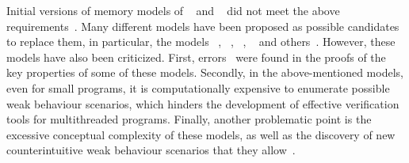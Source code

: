 Initial versions of memory models of \CPP~\autocite{Batty-al:POPL11} and \Java~\autocite{Manson-al:POPL05} did not meet the above requirements~\autocite{Sevcik-Aspinall:ECOOP08,Vafeiadis-al:POPL15,Batty-al:ESOP15}.
Many different models have been proposed as possible candidates to replace them, in particular, the models \Wkm~\autocite{Chakraborty-Vafeiadis:POPL19}, \Prm~\autocite{Kang-al:POPL17},
\MRD~\autocite{Paviotti-al:ESOP20}, \PwT~\autocite{Jagadeesan-al:OOPSLA2020,Jeffrey-al:POPL2022}
and others~\autocite{Jeffrey-Riely:LICS16, PichonPharabod-Sewell:POPL16, Paviotti-al:ESOP20}.
However, these models have also been criticized.
First, errors~\autocite{Jeffrey-Riely:LICS16,PichonPharabod-PhD18,Lahav-al:PLDI17} were found in the proofs of the key properties of some of these models. Secondly, in the above-mentioned models, even for small programs, it is computationally expensive to enumerate possible weak behaviour scenarios, which hinders the development of effective verification tools for multithreaded programs. Finally, another problematic point is the excessive conceptual complexity of these models, as well as the discovery of new counterintuitive weak behaviour scenarios that they allow~\autocite{Paviotti-al:ESOP20,Jagadeesan-al:OOPSLA2020,Lee-al:PLDI20,Cho-al:PLDI21}.

